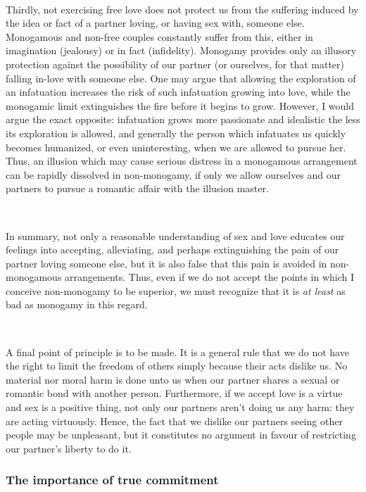 \documentclass[a4paper, 12pt]{article}
\begin{document}
~

Thirdly, not exercising free love does not protect us from the suffering induced 
by the idea or fact of a partner loving, or having sex with, someone else.
Monogamous and non-free couples constantly suffer from this, either in imagination
(jealousy) or in fact (infidelity). Monogamy provides only an illusory
protection against the possibility of our partner (or ourselves, for that
matter) falling in-love with someone else. One may argue that allowing the
exploration of an infatuation increases the risk of such infatuation growing
into love, while the monogamic limit extinguishes the fire before it begins to
grow. However, I would argue the exact opposite: infatuation grows more
passionate and idealistic the less its exploration is allowed, and generally
the person which infatuates us quickly becomes humanized, or even
uninteresting, when we are allowed to pursue her. Thus, an illusion which may
cause serious distress in a monogamous arrangement can be rapidly dissolved in
non-monogamy, if only we allow ourselves and our partners to pursue a romantic
affair with the illusion master.

~

In summary, not only a reasonable understanding of sex and love educates our
feelings into accepting, alleviating, and perhaps extinguishing the pain of our
partner loving someone else, but it is also false that this pain is avoided in
non-monogamous arrangements. Thus, even if we do not accept the points in which
I conceive non-monogamy to be superior, we must recognize that it is \textit{at
least} as bad as monogamy in this regard.

~

A final point of principle is to be made. It is a general rule that we do not
have the right to limit the freedom of others simply because their acts dislike
us. No material nor moral harm is done unto us when our partner shares a sexual
or romantic bond with another person. Furthermore, if we accept love is a
virtue and sex is a positive thing, not only our partners aren't doing us any
harm: they are acting virtuously. Hence, the fact that we dislike our partners
seeing other people may be unpleasant, but it constitutes no argument in favour
of restricting our partner's liberty to do it. 

\subsubsection{The importance of true commitment}
\end{document}
